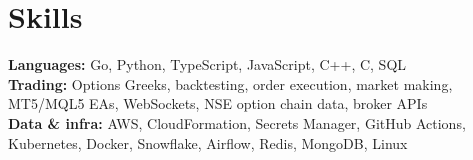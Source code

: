 \documentclass[10pt,a4paper]{article}
\begin{document}
\section{Skills}
\textbf{Languages:} Go, Python, TypeScript, JavaScript, C++, C, SQL\\
\textbf{Trading:} Options Greeks, backtesting, order execution, market making, MT5/MQL5 EAs, WebSockets, NSE option chain data, broker APIs\\
\textbf{Data \& infra:} AWS, CloudFormation, Secrets Manager, GitHub Actions, Kubernetes, Docker, Snowflake, Airflow, Redis, MongoDB, Linux
\end{document}
